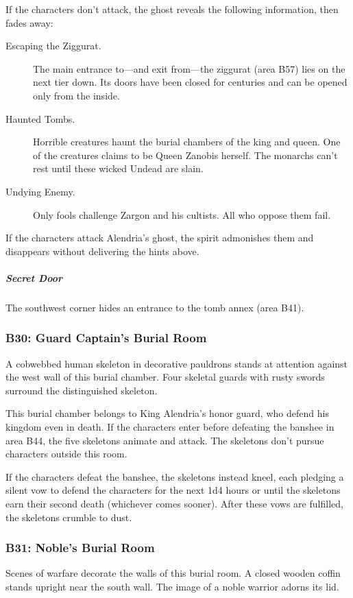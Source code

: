 \documentclass[10pt,a4paper,twoside,bg=print,twocolumn,openany,nodeprecatedcode]{dndbook}
\begin{document}
If the characters don't attack, the ghost reveals the following information, then fades away:


\begin{description}
\item[Escaping the Ziggurat.]
The main entrance to—and exit from—the ziggurat (area B57) lies on the next tier down. Its doors have been closed for centuries and can be opened only from the inside.
\item[Haunted Tombs.]
Horrible creatures haunt the burial chambers of the king and queen. One of the creatures claims to be Queen Zanobis herself. The monarchs can't rest until these wicked Undead are slain.
\item[Undying Enemy.]
Only fools challenge Zargon and his cultists. All who oppose them fail.
\end{description}

If the characters attack Alendria's ghost, the spirit admonishes them and disappears without delivering the hints above.

\subparagraph{Secret Door}
The southwest corner hides an entrance to the tomb annex (area B41).

\subsubsection{B30: Guard Captain's Burial Room}
\begin{DndReadAloud}{}
A cobwebbed human skeleton in decorative pauldrons stands at attention against the west wall of this burial chamber. Four skeletal guards with rusty swords surround the distinguished skeleton.

\end{DndReadAloud}

This burial chamber belongs to King Alendria's honor guard, who defend his kingdom even in death. If the characters enter before defeating the banshee in area B44, the five skeletons animate and attack. The skeletons don't pursue characters outside this room.

If the characters defeat the banshee, the skeletons instead kneel, each pledging a silent vow to defend the characters for the next 1d4 hours or until the skeletons earn their second death (whichever comes sooner). After these vows are fulfilled, the skeletons crumble to dust.

\subsubsection{B31: Noble's Burial Room}
\begin{DndReadAloud}{}
Scenes of warfare decorate the walls of this burial room. A closed wooden coffin stands upright near the south wall. The image of a noble warrior adorns its lid.

\end{DndReadAloud}
\end{document}
